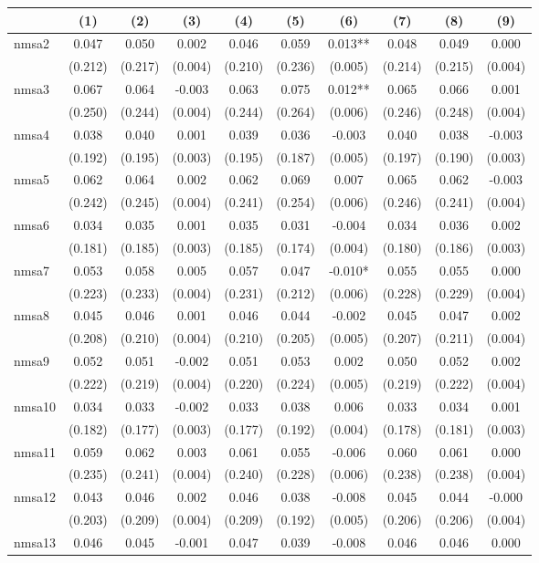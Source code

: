 \begin{tabular}{l*{9}c}
\hline\hline
 & (1) & (2) & (3) & (4) & (5) & (6) & (7) & (8) & (9) \\
\hline
nmsa2&0.047&0.050&0.002&0.046&0.059&0.013**&0.048&0.049&0.000\\
&(0.212)&(0.217)&(0.004)&(0.210)&(0.236)&(0.005)&(0.214)&(0.215)&(0.004)\\
nmsa3&0.067&0.064&-0.003&0.063&0.075&0.012**&0.065&0.066&0.001\\
&(0.250)&(0.244)&(0.004)&(0.244)&(0.264)&(0.006)&(0.246)&(0.248)&(0.004)\\
nmsa4&0.038&0.040&0.001&0.039&0.036&-0.003&0.040&0.038&-0.003\\
&(0.192)&(0.195)&(0.003)&(0.195)&(0.187)&(0.005)&(0.197)&(0.190)&(0.003)\\
nmsa5&0.062&0.064&0.002&0.062&0.069&0.007&0.065&0.062&-0.003\\
&(0.242)&(0.245)&(0.004)&(0.241)&(0.254)&(0.006)&(0.246)&(0.241)&(0.004)\\
nmsa6&0.034&0.035&0.001&0.035&0.031&-0.004&0.034&0.036&0.002\\
&(0.181)&(0.185)&(0.003)&(0.185)&(0.174)&(0.004)&(0.180)&(0.186)&(0.003)\\
nmsa7&0.053&0.058&0.005&0.057&0.047&-0.010*&0.055&0.055&0.000\\
&(0.223)&(0.233)&(0.004)&(0.231)&(0.212)&(0.006)&(0.228)&(0.229)&(0.004)\\
nmsa8&0.045&0.046&0.001&0.046&0.044&-0.002&0.045&0.047&0.002\\
&(0.208)&(0.210)&(0.004)&(0.210)&(0.205)&(0.005)&(0.207)&(0.211)&(0.004)\\
nmsa9&0.052&0.051&-0.002&0.051&0.053&0.002&0.050&0.052&0.002\\
&(0.222)&(0.219)&(0.004)&(0.220)&(0.224)&(0.005)&(0.219)&(0.222)&(0.004)\\
nmsa10&0.034&0.033&-0.002&0.033&0.038&0.006&0.033&0.034&0.001\\
&(0.182)&(0.177)&(0.003)&(0.177)&(0.192)&(0.004)&(0.178)&(0.181)&(0.003)\\
nmsa11&0.059&0.062&0.003&0.061&0.055&-0.006&0.060&0.061&0.000\\
&(0.235)&(0.241)&(0.004)&(0.240)&(0.228)&(0.006)&(0.238)&(0.238)&(0.004)\\
nmsa12&0.043&0.046&0.002&0.046&0.038&-0.008&0.045&0.044&-0.000\\
&(0.203)&(0.209)&(0.004)&(0.209)&(0.192)&(0.005)&(0.206)&(0.206)&(0.004)\\
nmsa13&0.046&0.045&-0.001&0.047&0.039&-0.008&0.046&0.046&0.000\\

\end{tabular}
